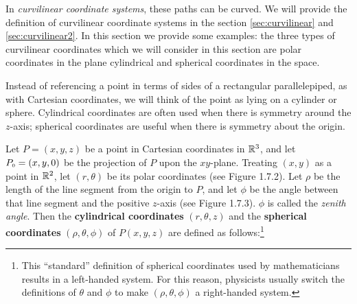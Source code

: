 In \emph{curvilinear coordinate systems}, these paths can be curved. We will provide the definition of
curvilinear coordinate systems in the section \ref{sec:curvilinear} and \ref{sec:curvilinear2}. In this section we provide some examples:
the three types of curvilinear coordinates which we will consider in this section  are polar coordinates in the plane  cylindrical and
spherical coordinates in the space.

Instead of referencing a point in terms of sides of a rectangular parallelepiped, as with Cartesian coordinates, we will
think of the point as lying on a cylinder or sphere.
Cylindrical coordinates are often used when there is symmetry around the $z$-axis; spherical
coordinates are useful when there is symmetry about the origin.


Let $P = (x,y,z)$ be
a point in Cartesian coordinates in $\mathbb{R}^3$, and let $P_{\scriptscriptstyle 0} = (x,y,0)$ be the projection of $P$ upon the
$xy$-plane. Treating $(x,y)$ as a point in $\mathbb{R}^2$, let $(r,\theta)$ be its polar coordinates (see
Figure 1.7.2). Let
$\rho$ be the length of the line segment from the origin to $P$, and let $\phi$ be the angle between that line segment
and the positive $z$-axis (see Figure 1.7.3). $\phi$ is called the \emph{zenith angle}. Then the
\textbf{cylindrical coordinates} $(r,\theta,z)$  and the \textbf{spherical coordinates} $ (\rho,\theta,\phi)$ of
$P(x,y,z)$ are defined as follows:\footnote{This ``standard'' definition of
spherical coordinates used by mathematicians results in a
left-handed system. For this reason, physicists usually switch the definitions
of $\theta$ and $\phi$ to make $(\rho,\theta,\phi)$ a right-handed system.}\vspace{2mm}


